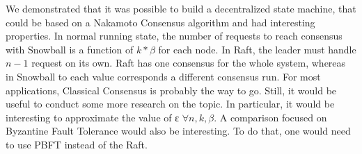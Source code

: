 \documentclass[11pt, twocolumn]{article}
\begin{document}
We demonstrated that it was possible to build a decentralized state machine, that could be based on a Nakamoto Consensus algorithm and had interesting properties.
In normal running state, the number of requests to reach consensus with Snowball is a function of $k * \beta$ for each node. In Raft, the leader must handle $n-1$ request on its own.
Raft has one consensus for the whole system, whereas in Snowball to each value corresponds a different consensus run. For most applications, Classical Consensus is probably the way to go. Still, it would be useful to conduct some more research on the topic.
In particular, it would be interesting to approximate the value of ε $\forall n, k, \beta$.
A comparison focused on Byzantine Fault Tolerance would also be interesting. To do that, one would need to use PBFT \cite{pbft} instead of the Raft.

\onecolumn
\end{document}
